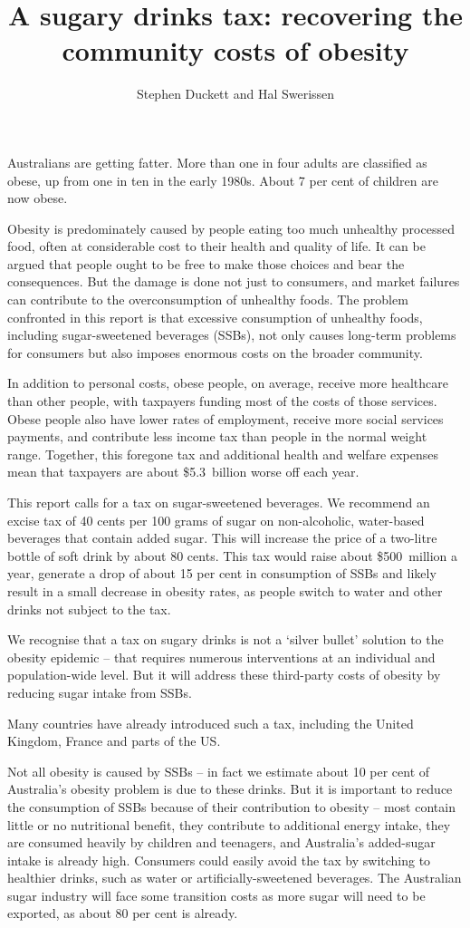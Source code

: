 \documentclass[embargoed]{grattan}
\title{A sugary drinks tax: recovering the community costs of obesity}
\author{Stephen Duckett and Hal Swerissen}
\begin{document}
\begin{overview}

Australians are getting fatter.
More than one in four adults are classified as obese, up from one in ten in the early 1980s. About 7 per cent of children are now obese.

Obesity is predominately caused by people eating too much unhealthy processed food, often at considerable cost to their health and quality of life. It can be argued that people ought to be free to make those choices and bear the consequences. But the damage is done not just to consumers, and market failures can contribute to the overconsumption of unhealthy foods. The problem confronted in this report is that excessive consumption of unhealthy foods, including sugar-sweetened beverages (SSBs), not only causes long-term problems for consumers but also imposes enormous costs on the broader community.

In addition to personal costs, obese people, on average, receive more healthcare than other people, with taxpayers funding most of the costs of those services.
Obese people also have lower rates of employment, receive more social services payments, and contribute less income tax than people in the normal weight range.
Together, this foregone tax and additional health and welfare expenses mean that taxpayers are about \$5.3~billion worse off each year. 

This report calls for a tax on sugar-sweetened beverages.
We recommend an excise tax of 40 cents per 100 grams of sugar on non-alcoholic, water-based beverages that contain added sugar.
This will increase the price of a two-litre bottle of soft drink by about 80 cents.
This tax would raise about \$500~million a year, generate a drop of about 15 per cent in consumption of SSBs and likely result in a small decrease in obesity rates, as people switch to water and other drinks not subject to the tax. 

We recognise that a tax on sugary drinks is not a ‘silver bullet’ solution to the obesity epidemic – that requires numerous interventions at an individual and population-wide level.
But it will address these third-party costs of obesity by reducing sugar intake from SSBs.

Many countries have already introduced such a tax, including the United Kingdom, France and parts of the US.

Not all obesity is caused by SSBs – in fact we estimate about 10 per cent of Australia’s obesity problem is due to these drinks.
But it is important to reduce the consumption of SSBs because of their contribution to obesity -- most contain little or no nutritional benefit, they contribute to additional energy intake,  they are consumed heavily by children and teenagers, and Australia’s added-sugar intake is already high.
Consumers could easily avoid the tax by switching to healthier drinks, such as water or artificially-sweetened beverages. The Australian sugar industry will face some transition costs as more sugar will need to be exported, as about 80 per cent is already. 


\end{overview}
\end{document}
